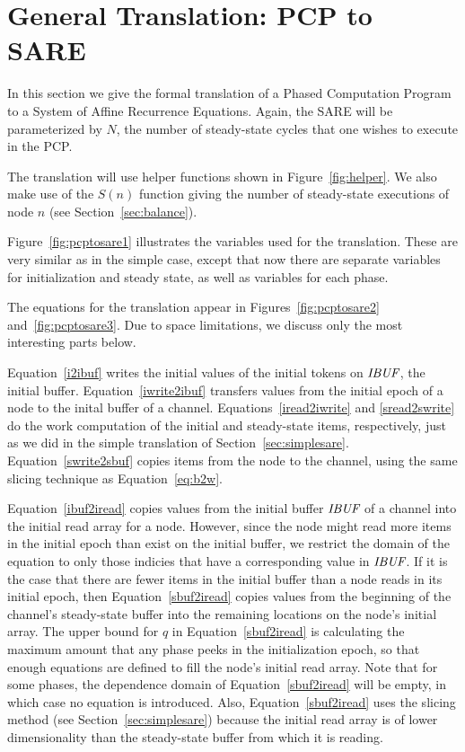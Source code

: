 \section{General Translation: PCP to SARE}
\label{sec:translate}

In this section we give the formal translation of a Phased Computation
Program to a System of Affine Recurrence Equations.  Again, the SARE
will be parameterized by $N$, the number of steady-state cycles that
one wishes to execute in the PCP.  

The translation will use helper functions shown in
Figure~\ref{fig:helper}.  We also make use of the $S(n)$ function
giving the number of steady-state executions of node $n$ (see
Section~\ref{sec:balance}).



Figure~\ref{fig:pcptosare1} illustrates the variables used for the
translation.  These are very similar as in the simple case, except
that now there are separate variables for initialization and steady
state, as well as variables for each phase.

The equations for the translation appear in
Figures~\ref{fig:pcptosare2} and~\ref{fig:pcptosare3}.  Due to space
limitations, we discuss only the most interesting parts below.

Equation~\ref{i2ibuf} writes the initial values of the initial tokens
on $\mbox{\it IBUF}$, the initial buffer.  Equation~\ref{iwrite2ibuf}
transfers values from the initial epoch of a node to the inital buffer
of a channel.  Equations~\ref{iread2iwrite} and \ref{sread2swrite} do
the work computation of the initial and steady-state items,
respectively, just as we did in the simple translation of
Section~\ref{sec:simplesare}.  Equation~\ref{swrite2sbuf} copies items
from the node to the channel, using the same slicing technique as
Equation~\ref{eq:b2w}.

Equation~\ref{ibuf2iread} copies values from the initial buffer
$\mbox{\it IBUF}$ of a channel into the initial read array for a node.
However, since the node might read more items in the initial epoch
than exist on the initial buffer, we restrict the domain of the
equation to only those indicies that have a corresponding value in
$\mbox{\it IBUF}$.  If it is the case that there are fewer items in the
initial buffer than a node reads in its initial epoch, then
Equation~\ref{sbuf2iread} copies values from the beginning of the
channel's steady-state buffer into the remaining locations on the
node's initial array.  The upper bound for $q$ in
Equation~\ref{sbuf2iread} is calculating the maximum amount that any
phase peeks in the initialization epoch, so that enough equations are
defined to fill the node's initial read array.  Note that for some
phases, the dependence domain of Equation~\ref{sbuf2iread} will be
empty, in which case no equation is introduced.  Also,
Equation~\ref{sbuf2iread} uses the slicing method (see
Section~\ref{sec:simplesare}) because the initial read array is of
lower dimensionality than the steady-state buffer from which it is
reading.

